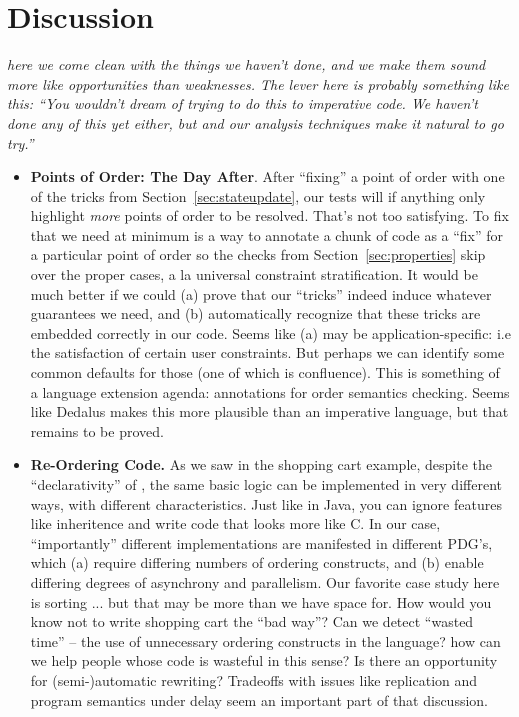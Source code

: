 \section{Discussion}
{\em here we come clean with the things we haven't done, and we make them sound more like opportunities than weaknesses.  The lever here is probably something like this: ``You wouldn't dream of trying to do this to imperative code.  We haven't done any of this yet either, but \lang and our analysis techniques make it natural to go try.''}

\begin{itemize}
    \item {\bf Points of Order: The Day After}.  After ``fixing'' a point of order with one of the tricks from Section~\ref{sec:stateupdate}, our tests will if anything only highlight {\em more} points of order to be resolved.  That's not too satisfying.  To fix that we need at minimum is a way to annotate a chunk of code as a ``fix'' for a particular point of order so the checks from Section~\ref{sec:properties} skip over the proper cases, a la universal constraint stratification. It would be much better if we could (a) prove that our ``tricks'' indeed induce whatever guarantees we need, and (b) automatically recognize that these tricks are embedded correctly in our code.  Seems like (a) may be application-specific: i.e the satisfaction of certain user constraints.  But perhaps we can identify some common defaults for those (one of which is confluence).  This is something of a language extension agenda: annotations for order semantics checking.  Seems like Dedalus makes this more plausible than an imperative language, but that remains to be proved.
    
    \item {\bf Re-Ordering Code.} As we saw in the shopping cart example, despite the ``declarativity'' of \lang, the same basic logic can be implemented in very different ways, with different characteristics.  Just like in Java, you can ignore features like inheritence and write code that looks more like C.  In our case, ``importantly'' different implementations are manifested in different PDG's, which (a) require differing numbers of ordering constructs, and (b) enable differing degrees of asynchrony and parallelism.  Our favorite case study here is sorting ... but that may be more than we have space for.  How would you know not to write shopping cart the ``bad way''? Can we detect ``wasted time'' -- the use of unnecessary ordering constructs in the language?  how can we help people whose code is wasteful in this sense?  Is there an opportunity for (semi-)automatic rewriting?  Tradeoffs with issues like replication and program semantics under delay seem an important part of that discussion.


\end{itemize}
